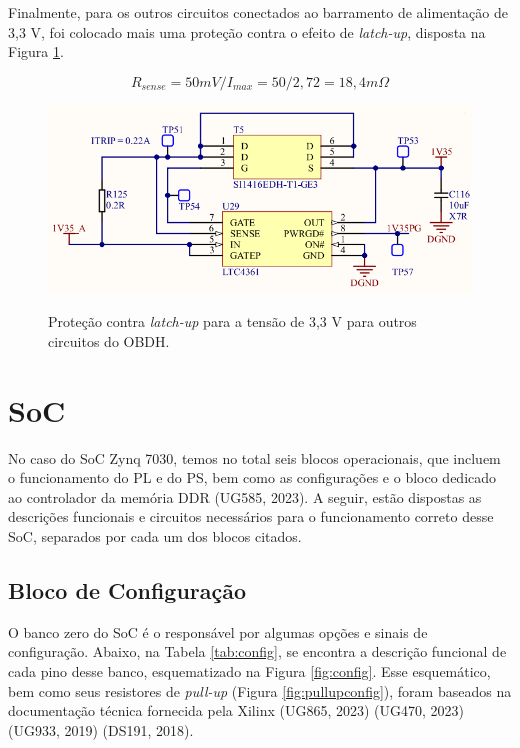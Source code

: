 Finalmente, para os outros circuitos conectados ao barramento de alimentação de 3,3 V, foi colocado mais uma proteção contra o efeito de \textit{latch-up}, disposta na Figura \ref{fig:3v3gocp}.

\begin{equation}
	R_{sense} = 50 mV / I_{max} =50 / 2,72 = 18,4 m\Omega
\end{equation} 

\begin{figure}[H]
    \centering
    \caption{Proteção contra \textit{latch-up} para a tensão de 3,3 V para outros circuitos do OBDH.}
    \includegraphics[scale=0.8]{images/1v35ocp.png}
    \label{fig:3v3gocp}
\end{figure}

\section{SoC}

No caso do SoC Zynq 7030, temos no total seis blocos operacionais, que incluem o funcionamento do PL e do PS, bem como as configurações e o bloco dedicado ao controlador da memória DDR (UG585, 2023). A seguir, estão dispostas as descrições funcionais e circuitos necessários para o funcionamento correto desse SoC, separados por cada um dos blocos citados.

\subsection{Bloco de Configuração}

O banco zero do SoC é o responsável por algumas opções e sinais de configuração. Abaixo, na Tabela \ref{tab:config}, se encontra a descrição funcional de cada pino desse banco, esquematizado na Figura \ref{fig:config}. Esse esquemático, bem como seus resistores de \textit{pull-up} (Figura \ref{fig:pullupconfig}), foram baseados na documentação técnica fornecida pela Xilinx (UG865, 2023) (UG470, 2023) (UG933, 2019) (DS191, 2018).


